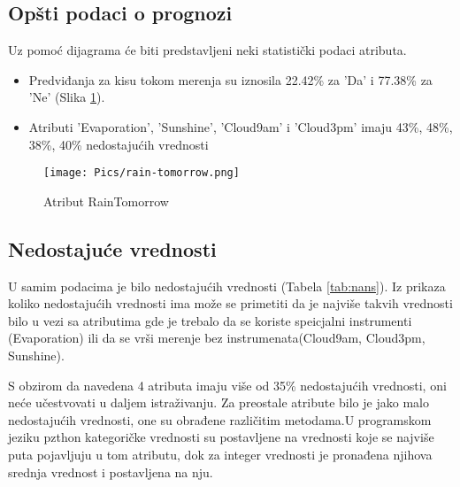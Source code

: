 \documentclass[a4paper]{article}
\begin{document}
\subsection{Opšti podaci o prognozi}
\label{subsec:opstiPodaci}
Uz pomoć dijagrama će biti predstavljeni neki statistički
podaci atributa.
\begin{itemize}
    \item 
        Predviđanja za kisu tokom merenja su iznosila 22.42\%  za 'Da' i 77.38\% za 'Ne'  (Slika \ref{fig:rainTomorrow}).
    \item 
        Atributi 'Evaporation', 'Sunshine', 'Cloud9am' i 'Cloud3pm' imaju
        43\%, 48\%, 38\%, 40\% nedostajućih vrednosti
\end{itemize}
\begin{figure}[ht]
     \centering
     \texttt{[image: Pics/rain-tomorrow.png]}
     \caption{Atribut RainTomorrow}
     \label{fig:rainTomorrow}
\end{figure}

\subsection{Nedostajuće vrednosti}
\label{subsec:nedostajuceVrednosti}

U samim podacima je bilo nedostajućih vrednosti (Tabela \ref{tab:nans}). Iz prikaza koliko nedostajućih vrednosti ima može se primetiti da je najviše takvih vrednosti bilo u vezi sa atributima gde je trebalo da se koriste speicjalni instrumenti (Evaporation) ili da se vrši merenje bez instrumenata(Cloud9am, Cloud3pm, Sunshine).\par
S obzirom da navedena 4 atributa imaju više od 35\% nedostajućih vrednosti, oni neće učestvovati u daljem istraživanju. Za preostale atribute bilo je jako malo nedostajućih vrednosti, one su obrađene različitim metodama.U programskom jeziku pzthon kategoričke vrednosti su postavljene na vrednosti koje se najviše puta pojavljuju u tom atributu, dok za integer vrednosti je pronađena njihova srednja vrednost i postavljena na nju.\par
\end{document}
